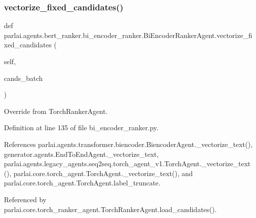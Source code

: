 \subsubsection{\texorpdfstring{vectorize\+\_\+fixed\+\_\+candidates()}{vectorize\_fixed\_candidates()}}
{\footnotesize\ttfamily def parlai.\+agents.\+bert\+\_\+ranker.\+bi\+\_\+encoder\+\_\+ranker.\+Bi\+Encoder\+Ranker\+Agent.\+vectorize\+\_\+fixed\+\_\+candidates (\begin{DoxyParamCaption}\item[{}]{self,  }\item[{}]{cands\+\_\+batch }\end{DoxyParamCaption})}

\begin{DoxyVerb}Override from TorchRankerAgent.
\end{DoxyVerb}
 

Definition at line 135 of file bi\+\_\+encoder\+\_\+ranker.\+py.



References parlai.\+agents.\+transformer.\+biencoder.\+Biencoder\+Agent.\+\_\+vectorize\+\_\+text(), generator.\+agents.\+End\+To\+End\+Agent.\+\_\+vectorize\+\_\+text, parlai.\+agents.\+legacy\+\_\+agents.\+seq2seq.\+torch\+\_\+agent\+\_\+v1.\+Torch\+Agent.\+\_\+vectorize\+\_\+text(), parlai.\+core.\+torch\+\_\+agent.\+Torch\+Agent.\+\_\+vectorize\+\_\+text(), and parlai.\+core.\+torch\+\_\+agent.\+Torch\+Agent.\+label\+\_\+truncate.



Referenced by parlai.\+core.\+torch\+\_\+ranker\+\_\+agent.\+Torch\+Ranker\+Agent.\+load\+\_\+candidates().

